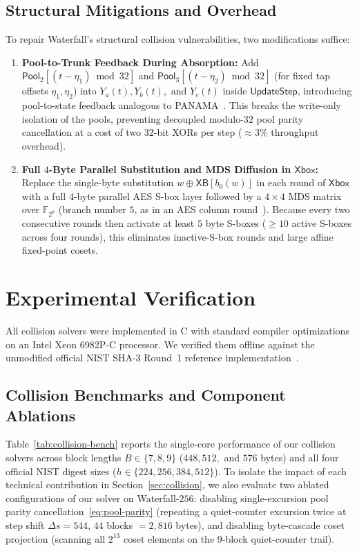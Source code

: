 \documentclass[11pt,a4paper]{article}
\theoremstyle{definition}
\theoremstyle{remark}
\newcommand{\Xbox}{\mathsf{Xbox}}
\newcommand{\UpdateStep}{\mathsf{UpdateStep}}
\newcommand{\Pool}{\mathsf{Pool}}
\begin{document}
\subsection{Structural Mitigations and Overhead}
To repair Waterfall's structural collision vulnerabilities, two modifications suffice:
\begin{enumerate}[leftmargin=2em]
    \item \textbf{Pool-to-Trunk Feedback During Absorption:} Add $\Pool_2[(t - \eta_1)\bmod 32]$ and $\Pool_3[(t - \eta_2)\bmod 32]$ (for fixed tap offsets $\eta_1, \eta_2$) into $Y_a(t), Y_b(t),$ and $Y_c(t)$ inside $\UpdateStep$, introducing pool-to-state feedback analogous to PANAMA~\cite{DC98}. This breaks the write-only isolation of the pools, preventing decoupled modulo-$32$ pool parity cancellation at a cost of two $32$-bit XORs per step ($\approx 3\%$ throughput overhead).
    \item \textbf{Full $4$-Byte Parallel Substitution and MDS Diffusion in $\Xbox$:} Replace the single-byte substitution $w \oplus \mathsf{XB}[b_0(w)]$ in each round of $\Xbox$ with a full $4$-byte parallel AES S-box layer followed by a $4 \times 4$ MDS matrix over $\mathbb{F}_{2^8}$ (branch number $5$, as in an AES column round~\cite{FIPSAES}). Because every two consecutive rounds then activate at least $5$ byte S-boxes ($\ge 10$ active S-boxes across four rounds), this eliminates inactive-S-box rounds and large affine fixed-point cosets.
\end{enumerate}

\section{Experimental Verification}
\label{sec:experiments}

All collision solvers were implemented in C with standard compiler optimizations on an Intel Xeon 6982P-C processor. We verified them offline against the unmodified official NIST SHA-3 Round~1 reference implementation~\cite{Hat08}.

\subsection{Collision Benchmarks and Component Ablations}
Table~\ref{tab:collision-bench} reports the single-core performance of our collision solvers across block lengths $B \in \{7, 8, 9\}$ ($448, 512,$ and $576$ bytes) and all four official NIST digest sizes ($h \in \{224, 256, 384, 512\}$). To isolate the impact of each technical contribution in Section~\ref{sec:collision}, we also evaluate two ablated configurations of our solver on Waterfall-$256$: disabling single-excursion pool parity cancellation~\eqref{eq:pool-parity} (repeating a quiet-counter excursion twice at step shift $\Delta s = 544$, $44$ blocks $= 2{,}816$ bytes), and disabling byte-cascade coset projection (scanning all $2^{13}$ coset elements on the $9$-block quiet-counter trail).
\end{document}
